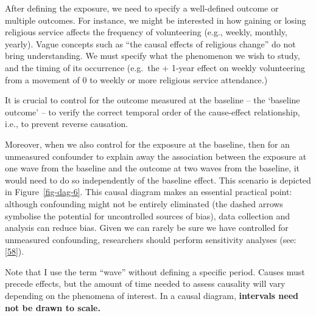 \documentclass[
  singlecolumn]{article}
\begin{document}
After defining the exposure, we need to specify a well-defined outcome
or multiple outcomes. For instance, we might be interested in how
gaining or losing religious service affects the frequency of
volunteering (e.g., weekly, monthly, yearly). Vague concepts such as
``the causal effects of religious change'' do not bring understanding.
We must specify what the phenomenon we wish to study, and the timing of
its occurrence (e.g.~the + 1-year effect on weekly volunteering from a
movement of 0 to weekly or more religious service attendance.)

It is crucial to control for the outcome measured at the baseline -- the
`baseline outcome' -- to verify the correct temporal order of the
cause-effect relationship, i.e., to prevent reverse causation.

Moreover, when we also control for the exposure at the baseline, then
for an unmeasured confounder to explain away the association between the
exposure at one wave from the baseline and the outcome at two waves from
the baseline, it would need to do so independently of the baseline
effect. This scenario is depicted in Figure~\ref{fig-dag-6}. This causal
diagram makes an essential practical point: although confounding might
not be entirely eliminated (the dashed arrows symbolise the potential
for uncontrolled sources of bias), data collection and analysis can
reduce bias. Given we can rarely be sure we have controlled for
unmeasured confounding, researchers should perform sensitivity analyses
(see: {[}\protect\hyperlink{ref-shi2021}{58}{]}).

Note that I use the term ``wave'' without defining a specific period.
Causes must precede effects, but the amount of time needed to assess
causality will vary depending on the phenomena of interest. In a causal
diagram, \textbf{intervals need not be drawn to scale.}
\end{document}
